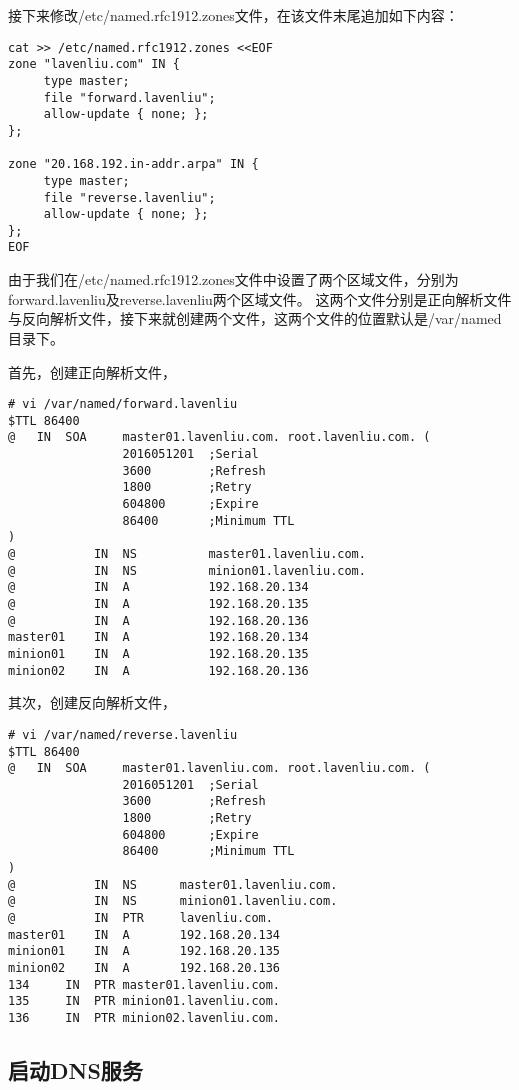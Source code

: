 接下来修改/etc/named.rfc1912.zones文件，在该文件末尾追加如下内容：

\begin{verbatim}
cat >> /etc/named.rfc1912.zones <<EOF
zone "lavenliu.com" IN {
     type master;
     file "forward.lavenliu";
     allow-update { none; };
};

zone "20.168.192.in-addr.arpa" IN {
     type master;
     file "reverse.lavenliu";
     allow-update { none; };
};
EOF
\end{verbatim}

由于我们在/etc/named.rfc1912.zones文件中设置了两个区域文件，分别为forward.lavenliu及reverse.lavenliu两个区域文件。
这两个文件分别是正向解析文件与反向解析文件，接下来就创建两个文件，这两个文件的位置默认是/var/named目录下。

首先，创建正向解析文件，

\begin{verbatim}
# vi /var/named/forward.lavenliu
$TTL 86400
@   IN  SOA     master01.lavenliu.com. root.lavenliu.com. (
		        2016051201  ;Serial
				3600        ;Refresh
				1800        ;Retry
				604800      ;Expire
				86400       ;Minimum TTL
)
@           IN  NS          master01.lavenliu.com.
@           IN  NS          minion01.lavenliu.com.
@           IN  A           192.168.20.134
@           IN  A           192.168.20.135
@           IN  A           192.168.20.136
master01    IN  A   	    192.168.20.134
minion01    IN  A   	    192.168.20.135
minion02    IN  A   	    192.168.20.136
\end{verbatim}

其次，创建反向解析文件，

\begin{verbatim}
# vi /var/named/reverse.lavenliu
$TTL 86400
@   IN  SOA     master01.lavenliu.com. root.lavenliu.com. (
		        2016051201  ;Serial
				3600        ;Refresh
				1800        ;Retry
				604800      ;Expire
				86400       ;Minimum TTL
)
@           IN  NS      master01.lavenliu.com.
@           IN  NS      minion01.lavenliu.com.
@           IN  PTR     lavenliu.com.
master01    IN  A   	192.168.20.134
minion01    IN  A   	192.168.20.135
minion02    IN  A   	192.168.20.136
134	    IN	PTR	master01.lavenliu.com.
135	    IN	PTR	minion01.lavenliu.com.
136	    IN	PTR	minion02.lavenliu.com.
\end{verbatim}

\subsection{启动DNS服务}
\label{sec:startDNS}

